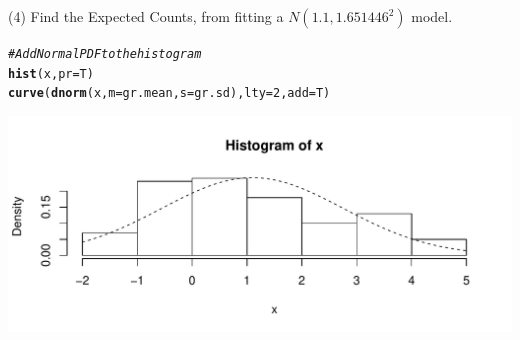 \documentclass[t,xcolor=pdftex,dvipsnames,table]{beamer}\usepackage[]{graphicx}\usepackage[]{color}
\makeatletter
\def\maxwidth{ %
  \ifdim\Gin@nat@width>\linewidth
    \linewidth
  \else
    \Gin@nat@width
  \fi
}
\newcommand{\hlnum}[1]{\textcolor[rgb]{0.686,0.059,0.569}{#1}}%
\newcommand{\hlcom}[1]{\textcolor[rgb]{0.678,0.584,0.686}{\textit{#1}}}%
\newcommand{\hlstd}[1]{\textcolor[rgb]{0.345,0.345,0.345}{#1}}%
\newcommand{\hlkwc}[1]{\textcolor[rgb]{0.333,0.667,0.333}{#1}}%
\newcommand{\hlkwd}[1]{\textcolor[rgb]{0.737,0.353,0.396}{\textbf{#1}}}%
\newenvironment{kframe}{%
 \def\at@end@of@kframe{}%
 \ifinner\ifhmode%
  \def\at@end@of@kframe{\end{minipage}}%
  \begin{minipage}{\columnwidth}%
 \fi\fi%
 \def\FrameCommand##1{\hskip\@totalleftmargin \hskip-\fboxsep
 \colorbox{shadecolor}{##1}\hskip-\fboxsep
     \hskip-\linewidth \hskip-\@totalleftmargin \hskip\columnwidth}%
 \MakeFramed {\advance\hsize-\width
   \@totalleftmargin\z@ \linewidth\hsize
   \@setminipage}}%
 {\par\unskip\endMakeFramed%
 \at@end@of@kframe}
\newenvironment{knitrout}{}{} %
\makeatother
\begin{document}
\begin{frame}[fragile]{}
(4) Find the Expected Counts, from fitting a $N(1.1, 1.651446^2)$ model.

\begin{knitrout}
\color{fgcolor}\begin{kframe}
\begin{alltt}
\hlcom{#Add Normal PDF to the histogram}
\hlkwd{hist}\hlstd{(x,} \hlkwc{pr}\hlstd{=T)}
\hlkwd{curve}\hlstd{(}\hlkwd{dnorm}\hlstd{(x,}\hlkwc{m}\hlstd{=gr.mean,}\hlkwc{s}\hlstd{=gr.sd),}\hlkwc{lty}\hlstd{=}\hlnum{2}\hlstd{,}\hlkwc{add}\hlstd{=T)}
\end{alltt}
\end{kframe}
\includegraphics[width=\maxwidth]{figure/unnamed-chunk-170-1} 

\end{knitrout}
\end{frame}
\end{document}
